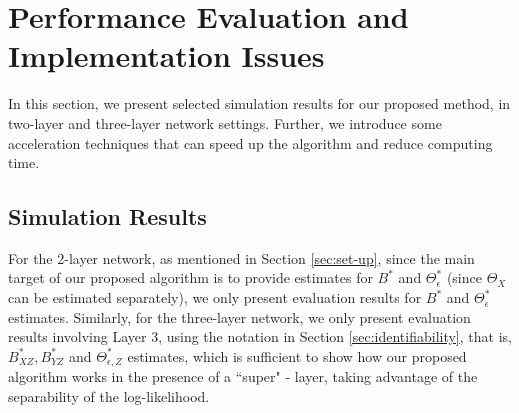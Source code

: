 \section{Performance Evaluation and Implementation Issues} \label{sec: Implementation}

In this section, we present selected simulation results for our proposed method, in two-layer and three-layer network settings. Further, we introduce some acceleration techniques that can speed up the algorithm and reduce computing time. 

\subsection{\normalsize Simulation Results}
For the 2-layer network, as mentioned in Section \ref{sec:set-up}, since the main target of our proposed algorithm is to provide estimates for $B^*$ and $\Theta_\epsilon^*$ (since $\Theta_X$ can be estimated separately), we only present evaluation results for $B^*$ and $\Theta_\epsilon^*$ estimates. Similarly, for the three-layer network, we only present evaluation results involving Layer 3, using the notation in Section \ref{sec:identifiability}, that is, $B^*_{XZ},B^*_{YZ}$ and $\Theta^*_{\epsilon,Z}$ estimates, which is sufficient to show how our proposed algorithm works in the presence of a 
``super" - layer, taking  advantage of the separability of the log-likelihood. 

